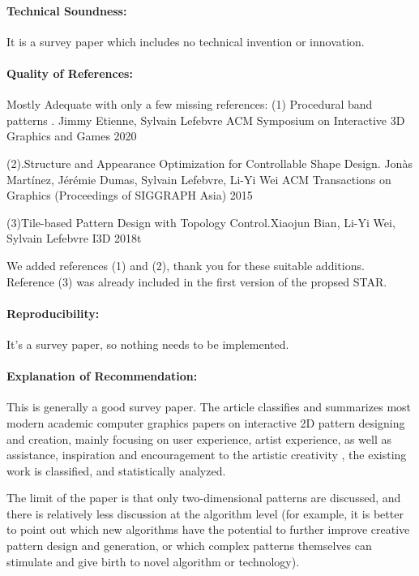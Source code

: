 \documentclass{egpubl}
\newcommand{\rev}[2]{{\color{greenrev}\textsuperscript{#1}#2}}
\renewcommand{\rev}[2]{{#2}}
\begin{document}
\paragraph*{Technical Soundness:} It is a survey paper which includes no technical invention or innovation.
\paragraph*{Quality of References:} Mostly Adequate with only a few missing references:
(1)
Procedural band patterns . Jimmy Etienne, Sylvain Lefebvre
ACM Symposium on Interactive 3D Graphics and Games 2020

(2).Structure and Appearance Optimization for Controllable Shape Design.
Jonàs Martínez, Jérémie Dumas, Sylvain Lefebvre, Li-Yi Wei
ACM Transactions on Graphics (Proceedings of SIGGRAPH Asia) 2015

(3)Tile-based Pattern Design with Topology Control.Xiaojun Bian, Li-Yi Wei, Sylvain Lefebvre
I3D 2018t

\rev{Comment}{
    We added references (1) and (2), thank you for these suitable additions. Reference (3) was already included in the first version of the propsed STAR.
}

\paragraph*{Reproducibility:} It's a survey paper, so nothing needs to be implemented.
\paragraph*{Explanation of Recommendation:} This is generally a good survey paper. The article classifies and summarizes most modern academic computer graphics papers on interactive 2D pattern designing and creation, mainly focusing on user experience, artist experience, as well as assistance, inspiration and encouragement  to the artistic creativity , the existing work is classified, and statistically analyzed.

The limit of the paper is that only two-dimensional patterns are discussed, and there is relatively less discussion at the algorithm level (for example, it is better to point out which new algorithms have the potential to further improve creative pattern design and generation, or which complex patterns themselves can stimulate and give birth to novel  algorithm or  technology).





%  
%        




\printbibliography
\end{document}
